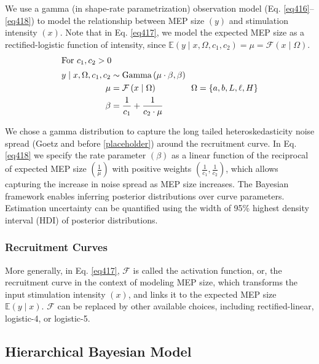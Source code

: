 \documentclass[pdflatex,sn-mathphys-ay]{sn-jnl}%
\numberwithin{equation}{subsection}
\theoremstyle{thmstyleone}%
\theoremstyle{thmstyletwo}%
\theoremstyle{thmstylethree}%
\begin{document}
We use a gamma (in shape-rate parametrization) observation model (Eq. \ref{eq416}--\ref{eq418}) to model the relationship between MEP size $\left(y\right)$ and stimulation intensity $\left(x\right)$. Note that in Eq. \ref{eq417}, we model the expected MEP size as a rectified-logistic function of intensity, since $\mathbb{E}\left(y \mid x, \Omega, c_1, c_2\right) = \mu = \mathcal{F}\left(x\mid\Omega\right)$.
\begin{align}
    \intertext{For $c_1, c_2 > 0$}
    y \mid x, \Omega, c_1, c_2 &\sim \text{Gamma}\left(\mu\cdot\beta, \beta\right) \label{eq416}\\
    \mu & = \mathcal{F}\left(x \mid \Omega\right) \label{eq417} \hspace{40pt}{\Omega} = \left\{a, b, L, \ell, H\right\}\\
    \beta &= \frac{1}{c_1} + \frac{1}{c_2\cdot\mu} \label{eq418}
\end{align}

We chose a gamma distribution to capture the long tailed heteroskedasticity noise spread (Goetz and before \ref{placeholder}) around the recruitment curve. In Eq. \ref{eq418} we specify the rate parameter $\left(\beta\right)$ as a linear function of the reciprocal of expected MEP size $\left(\frac1\mu\right)$ with positive weights $\left(\frac1{c_1}, \frac1{c_2}\right)$, which allows capturing the increase in noise spread as MEP size increases. The Bayesian framework enables inferring posterior distributions over curve parameters. Estimation uncertainty can be quantified using the width of 95\% highest density interval (HDI) of posterior distributions.

\subsubsection{Recruitment Curves}
More generally, in Eq. \ref{eq417}, $\mathcal{F}$ is called the activation function, or, the recruitment curve in the context of modeling MEP size, which transforms the input stimulation intensity $\left(x\right)$, and links it to the expected MEP size $\mathbb{E}\left(y\mid x\right)$. $\mathcal{F}$ can be replaced by other available choices, including rectified-linear, logistic-4, or logistic-5.

\subsection{Hierarchical Bayesian Model}
\end{document}
